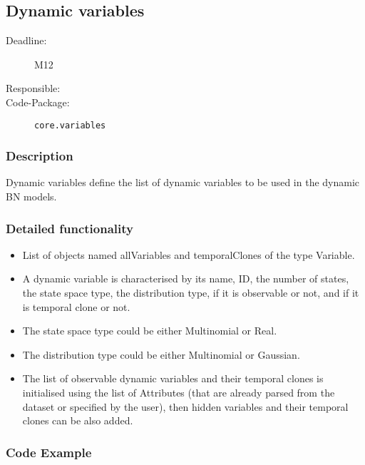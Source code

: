 \newpage
\subsection{Dynamic variables}
\label{Functionality:ID}

\begin{description}
\item[Deadline:] M12
\item[Responsible:]
\item[Code-Package:] \texttt{core.variables}
\end{description}

\subsubsection*{Description}

Dynamic variables define the list of dynamic variables to be used in the dynamic BN models.

\subsubsection*{Detailed functionality}

\begin{itemize}
\item List of objects named allVariables and temporalClones of the type Variable. 

\item A dynamic variable is characterised by its name, ID, the number of states, the state space type, the distribution type, if it is observable or not, and if it is temporal clone or not.

\item The state space type could be either Multinomial or Real.

\item The distribution type could be either Multinomial or Gaussian.

\item The list of observable dynamic variables and their temporal clones is initialised using the list of Attributes (that are already parsed from the dataset or specified by the user), then hidden variables and their temporal clones can be also added.

\end{itemize}

\subsubsection*{Code Example}


